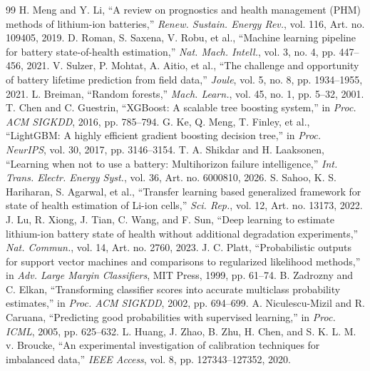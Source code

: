 \documentclass[preprint,12pt]{elsarticle}
\begin{document}
\raggedbottom
\begin{thebibliography}{99}
 H. Meng and Y. Li, ``A review on prognostics and health management (PHM) methods of lithium-ion batteries,'' \emph{Renew. Sustain. Energy Rev.}, vol. 116, Art. no. 109405, 2019.
 D. Roman, S. Saxena, V. Robu, et al., ``Machine learning pipeline for battery state-of-health estimation,'' \emph{Nat. Mach. Intell.}, vol. 3, no. 4, pp. 447--456, 2021.
 V. Sulzer, P. Mohtat, A. Aitio, et al., ``The challenge and opportunity of battery lifetime prediction from field data,'' \emph{Joule}, vol. 5, no. 8, pp. 1934--1955, 2021.
 L. Breiman, ``Random forests,'' \emph{Mach. Learn.}, vol. 45, no. 1, pp. 5--32, 2001.
 T. Chen and C. Guestrin, ``XGBoost: A scalable tree boosting system,'' in \emph{Proc. ACM SIGKDD}, 2016, pp. 785--794.
 G. Ke, Q. Meng, T. Finley, et al., ``LightGBM: A highly efficient gradient boosting decision tree,'' in \emph{Proc. NeurIPS}, vol. 30, 2017, pp. 3146--3154.
 T. A. Shikdar and H. Laaksonen, ``Learning when not to use a battery: Multihorizon failure intelligence,'' \emph{Int. Trans. Electr. Energy Syst.}, vol. 36, Art. no. 6000810, 2026.
 S. Sahoo, K. S. Hariharan, S. Agarwal, et al., ``Transfer learning based generalized framework for state of health estimation of Li-ion cells,'' \emph{Sci. Rep.}, vol. 12, Art. no. 13173, 2022.
 J. Lu, R. Xiong, J. Tian, C. Wang, and F. Sun, ``Deep learning to estimate lithium-ion battery state of health without additional degradation experiments,'' \emph{Nat. Commun.}, vol. 14, Art. no. 2760, 2023.
 J. C. Platt, ``Probabilistic outputs for support vector machines and comparisons to regularized likelihood methods,'' in \emph{Adv. Large Margin Classifiers}, MIT Press, 1999, pp. 61--74.
 B. Zadrozny and C. Elkan, ``Transforming classifier scores into accurate multiclass probability estimates,'' in \emph{Proc. ACM SIGKDD}, 2002, pp. 694--699.
 A. Niculescu-Mizil and R. Caruana, ``Predicting good probabilities with supervised learning,'' in \emph{Proc. ICML}, 2005, pp. 625--632.
 L. Huang, J. Zhao, B. Zhu, H. Chen, and S. K. L. M. v. Broucke, ``An experimental investigation of calibration techniques for imbalanced data,'' \emph{IEEE Access}, vol. 8, pp. 127343--127352, 2020.

\end{thebibliography}
\end{document}
